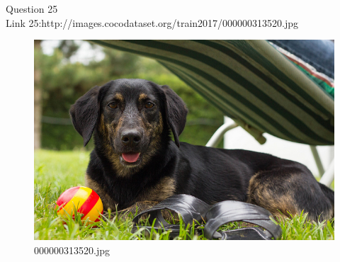Question 25\\
Link 25:http://images.cocodataset.org/train2017/000000313520.jpg
    \begin{figure}[h]
        \centering
        \includegraphics[width=0.8\linewidth]{../image set/easy/000000313520.jpg}
        \caption{000000313520.jpg}
    \end{figure}
